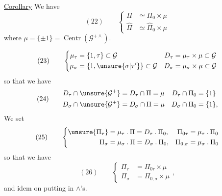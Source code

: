 \uline{Corollary} We have
\[
(22)\qquad
\left\{
\begin{aligned}
\Pi&\simeq\Pi_0\times\mu\\
\widehat{\Pi}&\simeq\widehat{\Pi}_0\times\mu
\end{aligned}
\right.
\]
where $\mu=\{\pm1\}=\operatorname{Centr}(\mathcal G^{+\wedge})$.





\[
(23)\qquad
\left\{
\begin{aligned}
\mu_\tau&=\{1,\tau\}\subset\mathcal G
&D_\tau&=\mu_\tau\times\mu\subset\mathcal G\\
\mu_\sigma&=\{1,\unsure{\sigma|\tau'}\}\subset\mathcal G
&D_\sigma&=\mu_\sigma\times\mu\subset\mathcal G
\end{aligned}
\right.
\]
so that we have
\[
(24)\qquad
\begin{aligned}
D_\tau\cap\unsure{\mathcal G^+}
&=D_\tau\cap\Pi=\mu
&D_\tau\cap\Pi_0&=\{1\}\\
D_\sigma\cap\unsure{\mathcal G^+}
&=D_\sigma\cap\Pi=\mu
&D_\sigma\cap\Pi_0&=\{1\},
\end{aligned}
\]
We set
\[
(25)\qquad
\left\{
\begin{aligned}
\unsure{\Pi_\tau}&=\mu_\tau\mathbin{.}\Pi=D_\tau\mathbin{.}\Pi_0,
&\Pi_{0\tau}&=\mu_\tau\mathbin{.}\Pi_0\\
\Pi_\sigma&=\mu_\sigma\mathbin{.}\Pi=D_\sigma\mathbin{.}\Pi_0,
&\Pi_{0,\sigma}&=\mu_\sigma\mathbin{.}\Pi_0
\end{aligned}
\right.
\]
so that we have
\[
(26)\qquad
\left\{
\begin{aligned}
\Pi_\tau&=\Pi_{0\tau}\times\mu\\
\Pi_\sigma&=\Pi_{0,\sigma}\times\mu
\end{aligned}
\right.,
\]
and idem on putting in $\wedge$'s.

